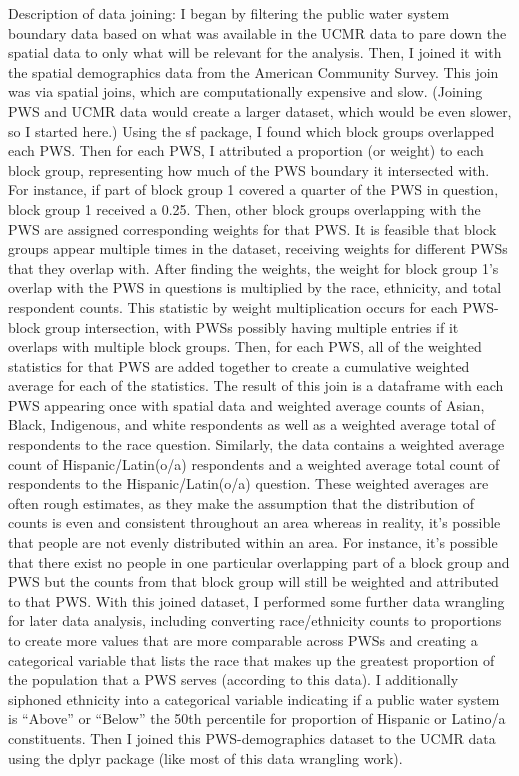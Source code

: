 \documentclass[
  letterpaper,
  DIV=11,
  numbers=noendperiod]{scrartcl}
\begin{document}
Description of data joining: I began by filtering the public water
system boundary data based on what was available in the UCMR data to
pare down the spatial data to only what will be relevant for the
analysis. Then, I joined it with the spatial demographics data from the
American Community Survey. This join was via spatial joins, which are
computationally expensive and slow. (Joining PWS and UCMR data would
create a larger dataset, which would be even slower, so I started here.)
Using the sf package, I found which block groups overlapped each PWS.
Then for each PWS, I attributed a proportion (or weight) to each block
group, representing how much of the PWS boundary it intersected with.
For instance, if part of block group 1 covered a quarter of the PWS in
question, block group 1 received a 0.25. Then, other block groups
overlapping with the PWS are assigned corresponding weights for that
PWS. It is feasible that block groups appear multiple times in the
dataset, receiving weights for different PWSs that they overlap with.
After finding the weights, the weight for block group 1's overlap with
the PWS in questions is multiplied by the race, ethnicity, and total
respondent counts. This statistic by weight multiplication occurs for
each PWS-block group intersection, with PWSs possibly having multiple
entries if it overlaps with multiple block groups. Then, for each PWS,
all of the weighted statistics for that PWS are added together to create
a cumulative weighted average for each of the statistics. The result of
this join is a dataframe with each PWS appearing once with spatial data
and weighted average counts of Asian, Black, Indigenous, and white
respondents as well as a weighted average total of respondents to the
race question. Similarly, the data contains a weighted average count of
Hispanic/Latin(o/a) respondents and a weighted average total count of
respondents to the Hispanic/Latin(o/a) question. These weighted averages
are often rough estimates, as they make the assumption that the
distribution of counts is even and consistent throughout an area whereas
in reality, it's possible that people are not evenly distributed within
an area. For instance, it's possible that there exist no people in one
particular overlapping part of a block group and PWS but the counts from
that block group will still be weighted and attributed to that PWS. With
this joined dataset, I performed some further data wrangling for later
data analysis, including converting race/ethnicity counts to proportions
to create more values that are more comparable across PWSs and creating
a categorical variable that lists the race that makes up the greatest
proportion of the population that a PWS serves (according to this data).
I additionally siphoned ethnicity into a categorical variable indicating
if a public water system is ``Above'' or ``Below'' the 50th percentile
for proportion of Hispanic or Latino/a constituents. Then I joined this
PWS-demographics dataset to the UCMR data using the dplyr package (like
most of this data wrangling work).
\end{document}
